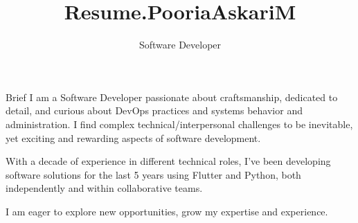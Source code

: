 \documentclass[
    a4paper, %
    12pt, %
]{resume.cls} %
\title{Resume.PooriaAskariM}
\subtitle{Software Developer}  %
\begin{document}
\raggedright
\setlength{\headheight}{42pt} %
\setlength{\footskip}{10pt}  %



\begin{rSection}{Brief}
\bigskip
I am a Software Developer passionate about craftsmanship, dedicated to detail, and curious about DevOps practices and systems behavior and administration. I find complex technical/interpersonal challenges to be inevitable, yet exciting and rewarding aspects of software development.

With a decade of experience in different technical roles, I've been developing software solutions for the last 5 years using Flutter and Python, both independently and within collaborative teams.

I am eager to explore new opportunities, grow my expertise and experience.
\bigskip


\end{rSection}

\end{document}
